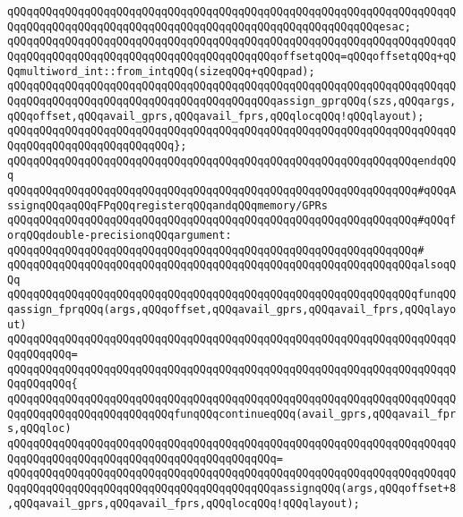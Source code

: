 \verb|qQQqqQQqqQQqqQQqqQQqqQQqqQQqqQQqqQQqqQQqqQQqqQQqqQQqqQQqqQQqqQQqqQQqqQQqqQQqqQQqqQQqqQQqqQQqqQQqqQQqqQQqqQQqqQQqqQQqqQQqqQQqqQQqesac;|\newline
\newline
\verb|qQQqqQQqqQQqqQQqqQQqqQQqqQQqqQQqqQQqqQQqqQQqqQQqqQQqqQQqqQQqqQQqqQQqqQQqqQQqqQQqqQQqqQQqqQQqqQQqqQQqqQQqqQQqqQQqoffsetqQQq=qQQqoffsetqQQq+qQQqmultiword_int::from_intqQQq(sizeqQQq+qQQqpad);|\newline
\verb|qQQqqQQqqQQqqQQqqQQqqQQqqQQqqQQqqQQqqQQqqQQqqQQqqQQqqQQqqQQqqQQqqQQqqQQqqQQqqQQqqQQqqQQqqQQqqQQqqQQqqQQqqQQqqQQqassign_gprqQQq(szs,qQQqargs,qQQqoffset,qQQqavail_gprs,qQQqavail_fprs,qQQqlocqQQq!qQQqlayout);|\newline
\verb|qQQqqQQqqQQqqQQqqQQqqQQqqQQqqQQqqQQqqQQqqQQqqQQqqQQqqQQqqQQqqQQqqQQqqQQqqQQqqQQqqQQqqQQqqQQqqQQq};|\newline
\verb|qQQqqQQqqQQqqQQqqQQqqQQqqQQqqQQqqQQqqQQqqQQqqQQqqQQqqQQqqQQqqQQqendqQQq|\newline
\newline
\verb|qQQqqQQqqQQqqQQqqQQqqQQqqQQqqQQqqQQqqQQqqQQqqQQqqQQqqQQqqQQqqQQq#qQQqAssignqQQqaqQQqFPqQQqregisterqQQqandqQQqmemory/GPRs|\newline
\verb|qQQqqQQqqQQqqQQqqQQqqQQqqQQqqQQqqQQqqQQqqQQqqQQqqQQqqQQqqQQqqQQq#qQQqforqQQqdouble-precisionqQQqargument:|\newline
\verb|qQQqqQQqqQQqqQQqqQQqqQQqqQQqqQQqqQQqqQQqqQQqqQQqqQQqqQQqqQQqqQQq#|\newline
\verb|qQQqqQQqqQQqqQQqqQQqqQQqqQQqqQQqqQQqqQQqqQQqqQQqqQQqqQQqqQQqqQQqalsoqQQq|\newline
\verb|qQQqqQQqqQQqqQQqqQQqqQQqqQQqqQQqqQQqqQQqqQQqqQQqqQQqqQQqqQQqqQQqfunqQQqassign_fprqQQq(args,qQQqoffset,qQQqavail_gprs,qQQqavail_fprs,qQQqlayout)|\newline
\verb|qQQqqQQqqQQqqQQqqQQqqQQqqQQqqQQqqQQqqQQqqQQqqQQqqQQqqQQqqQQqqQQqqQQqqQQqqQQqqQQq=|\newline
\verb|qQQqqQQqqQQqqQQqqQQqqQQqqQQqqQQqqQQqqQQqqQQqqQQqqQQqqQQqqQQqqQQqqQQqqQQqqQQqqQQq{|\newline
\verb|qQQqqQQqqQQqqQQqqQQqqQQqqQQqqQQqqQQqqQQqqQQqqQQqqQQqqQQqqQQqqQQqqQQqqQQqqQQqqQQqqQQqqQQqqQQqqQQqfunqQQqcontinueqQQq(avail_gprs,qQQqavail_fprs,qQQqloc)|\newline
\verb|qQQqqQQqqQQqqQQqqQQqqQQqqQQqqQQqqQQqqQQqqQQqqQQqqQQqqQQqqQQqqQQqqQQqqQQqqQQqqQQqqQQqqQQqqQQqqQQqqQQqqQQqqQQqqQQq=|\newline
\verb|qQQqqQQqqQQqqQQqqQQqqQQqqQQqqQQqqQQqqQQqqQQqqQQqqQQqqQQqqQQqqQQqqQQqqQQqqQQqqQQqqQQqqQQqqQQqqQQqqQQqqQQqqQQqqQQqassignqQQq(args,qQQqoffset+8,qQQqavail_gprs,qQQqavail_fprs,qQQqlocqQQq!qQQqlayout);|\newline

